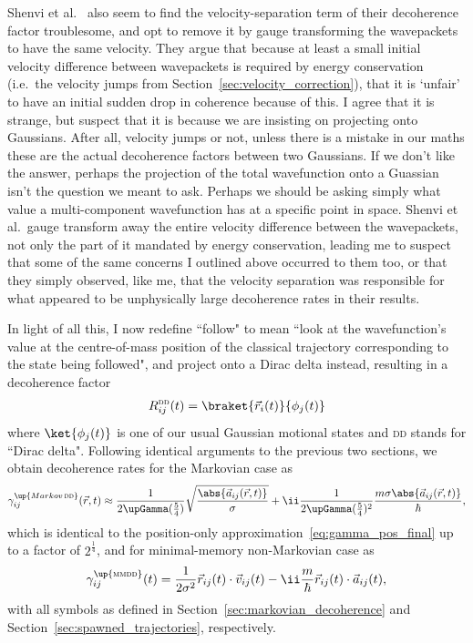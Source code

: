 Shenvi et al.~\cite{doi:10.1063/1.3575588} also seem to find the velocity-separation term of their decoherence factor troublesome, and opt to remove it by gauge transforming the wavepackets to have the same velocity. They argue that because at least a small initial velocity difference between wavepackets is required by energy conservation (i.e.~the velocity jumps from Section~\ref{sec:velocity_correction}), that it is `unfair' to have an initial sudden drop in coherence because of this. I agree that it is strange, but suspect that it is because we are insisting on projecting onto Gaussians. After all, velocity jumps or not, unless there is a mistake in our maths these are the actual decoherence factors between two Gaussians. If we don't like the answer, perhaps the projection of the total wavefunction onto a Guassian isn't the question we meant to ask. Perhaps we should be asking simply what value a multi-component wavefunction has at a specific point in space. Shenvi et al.~gauge transform away the entire velocity difference between the wavepackets, not only the part of it mandated by energy conservation, leading me to suspect that some of the same concerns I outlined above occurred to them too, or that they simply observed, like me, that the velocity separation was responsible for what appeared to be unphysically large decoherence rates in their results.

In light of all this, I now redefine ``follow" to mean ``look at the wavefunction's value at the centre-of-mass position of the classical trajectory corresponding to the state being followed", and project onto a Dirac delta instead, resulting in a decoherence factor
\begin{align}
R^{\textsc{dd}}_{ij}(t) = \braket{\vec r_i(t)}{\phi_j(t)}
\end{align}
where $\ket{\phi_j(t)}$ is one of our usual Gaussian motional states and \textsc{dd} stands for ``Dirac delta". Following identical arguments to the previous two sections, we obtain decoherence rates for the Markovian case as
\begin{align}\label{eq:markovian_decoherence_rate_dd}
\gamma^\up{Markov\,\textsc{dd}}_{ij}(\vec r, t) \approx \frac1{2\upGamma(\frac54)}\sqrt{\frac{\abs{\vec a_{ij}(\vec r, t)}}{\sigma}} + \ii\frac1{2\upGamma(\frac54)^2}\frac{m\sigma\abs{\vec a_{ij}(\vec r, t)}}{\hbar},
\end{align}
which is identical to the position-only approximation~\eqref{eq:gamma_pos_final} up to a factor of $2^{\frac14}$, and for minimal-memory non-Markovian case as 
\begin{align}\label{eq:minimal_memory_decoherence_rate_dd}
\gamma^\up{\textsc{mmdd}}_{ij}(t) = \frac1{2\sigma^2}\vec r_{ij}(t)\cdot\vec v_{ij}(t)
                        - \ii \frac m\hbar\vec r_{ij}(t)\cdot \vec a_{ij}(t),
\end{align}
with all symbols as defined in Section~\ref{sec:markovian_decoherence} and Section~\ref{sec:spawned_trajectories}, respectively.

